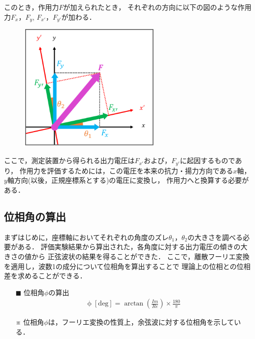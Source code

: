 \documentclass[twocolumn,a4j]{jsarticle}
\begin{document}
\newpage

このとき，作用力$F$が加えられたとき，
それぞれの方向に以下の図のような作用力$F_x$，$F_y$, $F_{x'}$，$F_{y'}$が加わる．

\begin{figure}[htbp]
    \footnotesize
    \begin{center}
        \includegraphics[width=70mm]{../images/image_2.png}
        \caption{}
    \end{center}
\end{figure}

ここで，測定装置から得られる出力電圧は$F_{x'}$および，$F_{y'}$に起因するものであり，
作用力を評価するためには，この電圧を本来の抗力・揚力方向である$x$軸，$y$軸方向(以後，正規座標系とする)の電圧に変換し，
作用力へと換算する必要がある．\\

\subsection{位相角の算出}
まずはじめに，座標軸においてそれぞれの角度のズレ$\theta_1$，$\theta_2$の大きさを調べる必要がある．
評価実験結果から算出された，各角度に対する出力電圧の傾きの大きさの値から
正弦波状の結果を得ることができた．
ここで，離散フーリエ変換を適用し，波数1の成分について位相角を算出することで
理論上の位相との位相差を求めることができる．

\begin{itemize}
    \item [$\blacksquare$] 位相角$\phi$の算出
          \begin{eqnarray*}
              \mathrm{\phi \; [deg]} = \arctan \left(\frac{Im}{Re}\right) × \frac{180}{\pi}
          \end{eqnarray*}
    \item [※] 位相角$\phi$は，フーリエ変換の性質上，余弦波に対する位相角を示している．
\end{itemize}
\end{document}
